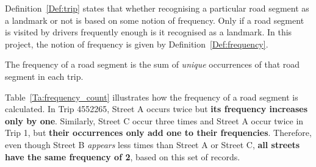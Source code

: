 \begin{table}[h!]
\centering
{}
\caption{An illustration of frequency counting}\label{Ta:frequency_count}
\end{table}

Definition~\ref{Def:trip} states that whether recognising a particular road segment as a landmark or not is based on some notion of frequency. Only if a road segment is visited by drivers frequently enough is it recognised as a landmark. In this project, the notion of frequency is given by Definition~\ref{Def:frequency}.

\begin{defn}\label{Def:frequency}
The frequency of a road segment is the sum of \emph{unique} occurrences of that road segment in each trip. 
\end{defn}

Table~\ref{Ta:frequency_count} illustrates how the frequency of a road segment is calculated. In Trip 4552265, Street A occurs twice but \textbf{its frequency increases only by one}. Similarly, Street C occur three times and Street A occur twice in Trip 1, but \textbf{their occurrences only add one to their frequencies}. Therefore, even though Street B \emph{appears} less times than Street A or Street C, \textbf{all streets have the same frequency of 2}, based on this set of records.  

